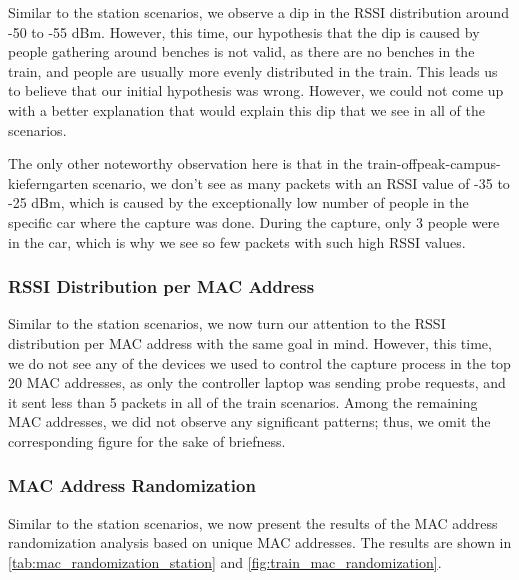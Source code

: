 \documentclass[sigconf,nonacm]{acmart}
\begin{document}
Similar to the station scenarios, we observe a dip in the RSSI distribution around -50 to -55 dBm. However, this time, our hypothesis that the dip is caused by people gathering around benches is not valid, as there are no benches in the train, and people are usually more evenly distributed in the train. This leads us to believe that our initial hypothesis was wrong. However, we could not come up with a better explanation that would explain this dip that we see in all of the scenarios.

The only other noteworthy observation here is that in the train-offpeak-campus-kieferngarten scenario, we don't see as many packets with an RSSI value of -35 to -25 dBm, which is caused by the exceptionally low number of people in the specific car where the capture was done. During the capture, only 3 people were in the car, which is why we see so few packets with such high RSSI values.

\subsubsection{RSSI Distribution per MAC Address}
\label{sec:part-1/train/rssi-distribution-per-mac}
Similar to the station scenarios, we now turn our attention to the RSSI distribution per MAC address with the same goal in mind.
However, this time, we do not see any of the devices we used to control the capture process in the top 20 MAC addresses, as only the controller laptop was sending probe requests, and it sent less than 5 packets in all of the train scenarios. Among the remaining MAC addresses, we did not observe any significant patterns; thus, we omit the corresponding figure for the sake of briefness.

\subsubsection{MAC Address Randomization}
\label{sec:part-1/train/mac-randomization}
Similar to the station scenarios, we now present the results of the MAC address randomization analysis based on unique MAC addresses. The results are shown in \cref{tab:mac_randomization_station} and \cref{fig:train_mac_randomization}.

\begin{table}[ht]
    \centering
    \caption{MAC Address Randomization Ratios in Train Scenarios}
    \label{tab:mac_randomization_train}
\end{table}
\end{document}
